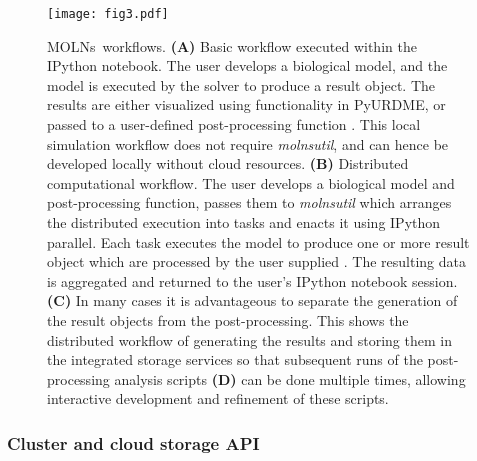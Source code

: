\documentclass[final,leqno,onefignum,onetabnum]{siamltex1213}
\def\packagename {MOLNs}
\begin{document}
\begin{figure}[htpb]
\begin{center}
\texttt{[image: fig3.pdf]}
\end{center}
\caption{\packagename~workflows.
{\bf (A)} Basic workflow executed within the IPython notebook.  The user develops a biological model, and the model is executed by the solver to produce a result object. The results are either visualized using functionality in PyURDME, or passed to a user-defined post-processing function . This local simulation workflow does not require \emph{molnsutil}, and can hence be developed locally without cloud resources. 
{\bf (B)} Distributed computational workflow. The user develops a biological model and post-processing function, passes them to \emph{molnsutil} which arranges the distributed execution into tasks and enacts it using IPython parallel. Each task executes the model to produce one or more result object which are processed by the user supplied .  The resulting data is aggregated and returned to the user's IPython notebook session.
{\bf (C)} In many cases it is advantageous to separate the generation of the result objects from the post-processing.  This shows the distributed workflow of generating the results and storing them in the integrated storage services so that subsequent runs of the post-processing analysis scripts {\bf (D)} can be done multiple times, allowing interactive development and refinement of these scripts.
}
\label{fig:workflows}
\end{figure}

\subsubsection{Cluster and cloud storage API}
\end{document}
